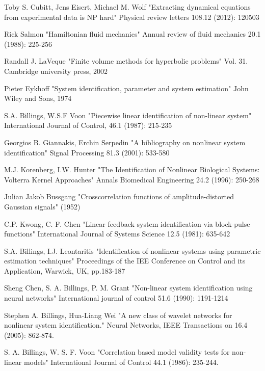 \documentclass[a4paper,onecolumn]{article}
\theoremstyle{remark}
\begin{document}
\begin{thebibliography}{9}
Toby S. Cubitt, Jens Eisert, Michael M. Wolf
"Extracting dynamical equations from experimental data is NP hard"
Physical review letters 108.12 (2012): 120503

Rick Salmon 
"Hamiltonian fluid mechanics"
Annual review of fluid mechanics 20.1 (1988): 225-256

Randall J. LaVeque
"Finite volume methods for hyperbolic problems"
Vol. 31. Cambridge university press, 2002

Pieter Eykhoff
"System identification, parameter and system estimation"
John Wiley and Sons, 1974

S.A. Billings, W.S.F Voon
"Piecewise linear identification of non-linear system"
International Journal of Control, 46.1 (1987): 215-235

Georgios B. Giannakis, Erchin Serpedin
"A bibliography on nonlinear system identification"
Signal Processing 81.3 (2001): 533-580

M.J. Korenberg, I.W. Hunter
"The Identification of Nonlinear Biological Systems: Volterra Kernel Approaches"
Annals Biomedical Engineering 24.2 (1996): 250-268

Julian Jakob Bussgang
"Crosscorrelation functions of amplitude-distorted Gaussian signals" 
(1952)

C.P. Kwong, C. F. Chen
"Linear feedback system identification via block-pulse functions"
International Journal of Systems Science 12.5 (1981): 635-642

S.A. Billings, I.J. Leontaritis
"Identification of nonlinear systems using parametric estimation techniques"
Proceedings of the IEE Conference on Control and its Application, Warwick, UK, pp.183-187

Sheng Chen, S. A. Billings, P. M. Grant
"Non-linear system identification using neural networks" 
International journal of control 51.6 (1990): 1191-1214

Stephen A. Billings, Hua-Liang Wei
"A new class of wavelet networks for nonlinear system identification."
Neural Networks, IEEE Transactions on 16.4 (2005): 862-874.

S. A. Billings, W. S. F. Voon
"Correlation based model validity tests for non-linear models"
International Journal of Control 44.1 (1986): 235-244.


\end{thebibliography}
\end{document}
